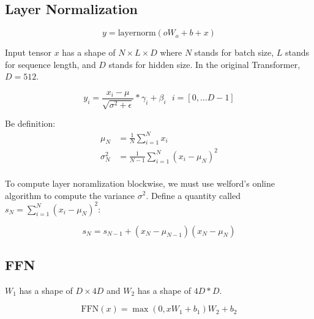 
\subsection{Layer Normalization}

$$y = \text{layernorm}(oW_o + b + x)$$

Input tensor $x$ has a shape of $N \times L \times D$ where $N$ stands for batch size, $L$ stands for sequence length, and $D$ stands for hidden size.
In the original Transformer, $D = 512$.

$$y_i=\frac{x_i-\mu}{\sqrt{\sigma^2 + \epsilon}}*\gamma_i+\beta_i\ \ \ i = [0, \ldots D-1]$$

Be definition:
\begin{align*}
    \mu_N &= \frac{1}{N}\sum_{i=1}^{N}x_i \\
    \sigma_{N}^2&=\frac{1}{N-1}\sum_{i=1}^{N}(x_i-\mu_{N})^2 \\
\end{align*}

To compute layer noramlization blockwise, we must use welford's online algorithm\cite{welford1962note} to compute the variance $\sigma^2$.
Define a quantity called $s_N = \sum^{N}_{i=1}(x_i - \mu_{N})^2$:

$$s_{N}=s_{N-1}+(x_N-\mu_{N-1})(x_N-\mu_N)$$

\subsection{FFN}

$W_1$ has a shape of $D \times 4D$ and $W_2$ has a shape of $4D * D$.

$$\text{FFN}(x) =\max(0, xW_1+b_1)W_2+b_2$$

\begin{align*}
\end{align*}

